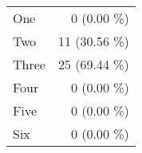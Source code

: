 \begin{tabular}{ l  r }
One & 0 (0.00 \%)\\
Two & 11 (30.56 \%)\\
Three & 25 (69.44 \%)\\
Four & 0 (0.00 \%)\\
Five & 0 (0.00 \%)\\
Six & 0 (0.00 \%)\\
\end{tabular}